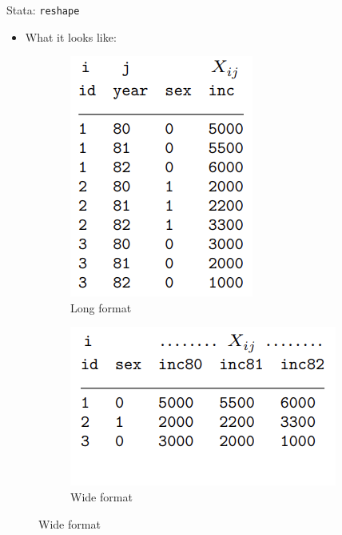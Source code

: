 \documentclass[11pt,notes=hide,aspectratio=169,mathserif]{beamer}
\begin{document}
\begin{frame}{Stata: \texttt{reshape}}
\begin{itemize}
\item What it looks like:
\end{itemize}
\begin{figure}[htbp]
\centering
\begin{subfigure}{0.25\textwidth}
\includegraphics[width=\textwidth]{inputs/reshape1.png}
\caption{Long format}
\end{subfigure}
\hfill
\pause
\begin{subfigure}{0.45\textwidth}
\includegraphics[width=\textwidth]{inputs/reshape2.png}
\caption{Wide format}
\end{subfigure}
\end{figure}
\end{frame}
    
\end{document}
